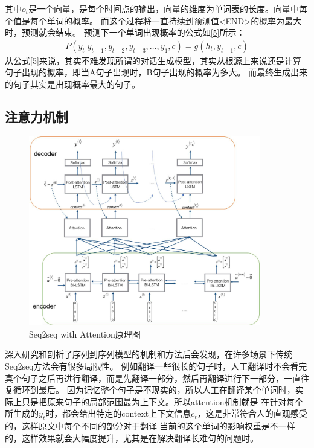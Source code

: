 \documentclass[supercite]{HustGraduPaper}
\theoremstyle{definition}
\begin{document}
其中$o_t$是一个向量，是每个时间点的输出，向量的维度为单词表的长度。向量中每个值是每个单词的概率。
而这个过程将一直持续到预测值<END>的概率为最大时，预测就会结束。
预测下一个单词出现概率的公式如\ref{5}所示：
\begin{align}
  P(y_{t}|y_{t-1},y_{t-2},y_{t-3},\dots,y_{1},c) = g(h_{t},y_{t-1},c) \label{5}
\end{align}
从公式\ref{5}来说，其实不难发现所谓的对话生成模型，其实从根源上来说还是计算句子出现的概率，即当A句子出现时，B句子出现的概率为多大。
而最终生成出来的句子其实是出现概率最大的句子。


\subsection{注意力机制}
\begin{figure}[H] %
  \centering %
  \includegraphics[width=0.9\textwidth]{images/attention.jpg} %
  \caption{Seq2seq with Attention原理图} %
  \label{Fig.attention} %
\end{figure}
深入研究和剖析了序列到序列模型的机制和方法后会发现，在许多场景下传统Seq2seq方法会有很多局限性。
例如翻译一些很长的句子时，人工翻译时不会看完真个句子之后再进行翻译，而是先翻译一部分，然后再翻译进行下一部分，一直往复循环到最后。
因为记忆整个句子是不现实的，所以人工在翻译某个单词时，实际上只是把原来句子的局部范围最为上下文。所以attention机制就是
在针对每个所生成的$y_{t}$时，都会给出特定的context上下文信息$c_{t}$，这是非常符合人的直观感受的，这样原文中每个不同的部分对于翻译
当前的这个单词的影响权重是不一样的，这样效果就会大幅度提升，尤其是在解决翻译长难句的问题时。
\end{document}
